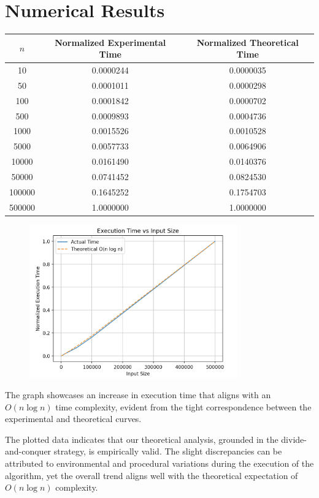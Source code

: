 \documentclass{article}
\begin{document}
\section*{Numerical Results}

{
\footnotesize
\begin{tabular}{|c|c|c|}
\hline
\( n \) & Normalized Experimental Time & Normalized Theoretical Time\\
\hline
10 & 0.0000244 & 0.0000035 \\
50 & 0.0001011 & 0.0000298 \\
100 & 0.0001842 & 0.0000702 \\
500 & 0.0009893 & 0.0004736 \\
1000 & 0.0015526 & 0.0010528 \\
5000 & 0.0057733 & 0.0064906 \\
10000 & 0.0161490 & 0.0140376 \\
50000 & 0.0741452 & 0.0824530 \\
100000 & 0.1645252 & 0.1754703 \\
500000 & 1.0000000 & 1.0000000 \\
\hline
\end{tabular}
}

\begin{figure}[H]
    \centering
    \includegraphics[width=0.8\textwidth]{image}
\end{figure}

The graph showcases an increase in execution time that aligns with an \(O(n \log n)\) time complexity, evident from the tight correspondence between the experimental and theoretical curves.

The plotted data indicates that our theoretical analysis, grounded in the divide-and-conquer strategy, is empirically valid. The slight discrepancies can be attributed to environmental and procedural variations during the execution of the algorithm, yet the overall trend aligns well with the theoretical expectation of \(O(n \log n)\) complexity.
\end{document}
